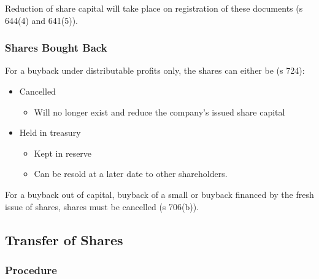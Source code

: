 \documentclass[
]{article}
\newenvironment{Shaded}{}{}
\newcommand{\NormalTok}[1]{#1}
\providecommand{\tightlist}{%
  \setlength{\itemsep}{0pt}\setlength{\parskip}{0pt}}
\begin{document}
\begin{Shaded}
\begin{Highlighting}[]
\NormalTok{Reduction of share capital will take place on registration of these documents (s 644(4) and 641(5)). }
\end{Highlighting}
\end{Shaded}

\hypertarget{shares-bought-back}{%
\subsubsection{Shares Bought Back}\label{shares-bought-back}}

For a buyback under distributable profits only, the shares can either be
(s 724):

\begin{itemize}
\tightlist
\item
  Cancelled

  \begin{itemize}
  \tightlist
  \item
    Will no longer exist and reduce the company's issued share capital
  \end{itemize}
\item
  Held in treasury

  \begin{itemize}
  \tightlist
  \item
    Kept in reserve
  \item
    Can be resold at a later date to other shareholders.
  \end{itemize}
\end{itemize}

For a buyback out of capital, buyback of a small or buyback financed by
the fresh issue of shares, shares must be cancelled (s 706(b)).

\hypertarget{transfer-of-shares}{%
\subsection{Transfer of Shares}\label{transfer-of-shares}}

\hypertarget{procedure-2}{%
\subsubsection{Procedure}\label{procedure-2}}
\end{document}
